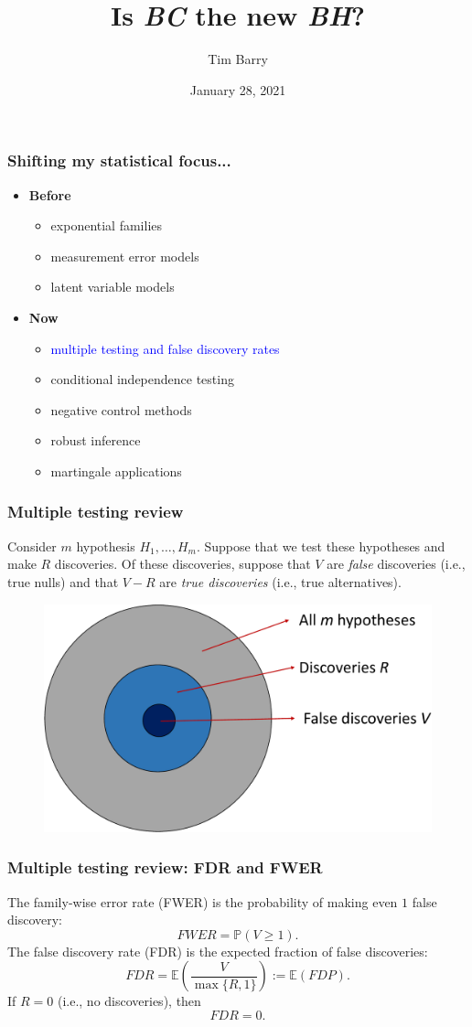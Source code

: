 \documentclass{beamer}
\title{Is \textit{BC} the new \textit{BH}?}
\author{Tim Barry}
\date{January 28, 2021}
\begin{document}
\frame{\titlepage}

\begin{frame}
\frametitle{Shifting my statistical focus...}
\begin{itemize}
\item \textbf{Before}
\begin{itemize}
\item exponential families
\item measurement error models
\item latent variable models
\end{itemize}
\item \textbf{Now}
\begin{itemize}
\item \textcolor{blue}{multiple testing and false discovery rates}
\item conditional independence testing
\item negative control methods
\item robust inference
\item martingale applications 
\end{itemize}
\end{itemize}
\end{frame}


\begin{frame}
\frametitle{Multiple testing review}
Consider $m$ hypothesis $H_1, \dots, H_m$. Suppose that we test these hypotheses and make $R$ discoveries. Of these discoveries, suppose that $V$ are \textit{false} discoveries (i.e., true nulls) and that $V - R$ are \textit{true discoveries} (i.e., true alternatives).

\begin{figure}
	\centering
	\includegraphics[width=0.8\linewidth]{fdr_fig}
	\label{fdrfig}
\end{figure}
\end{frame}

\begin{frame}
\frametitle{Multiple testing review: FDR and FWER}
The family-wise error rate (FWER) is the probability of making even $1$ false discovery:
$$FWER = \mathbb{P}(V \geq 1).$$
The false discovery rate (FDR) is the expected fraction of false discoveries:
$$FDR = \mathbb{E}\left( \frac{V}{ \max\{ R, 1 \}} \right) := \mathbb{E} \left( FDP \right).$$
If $R = 0$ (i.e., no discoveries), then
$$ FDR = 0.$$
\end{frame}
\end{document}
